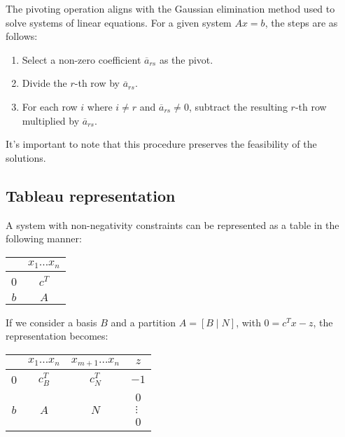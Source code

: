 The pivoting operation aligns with the Gaussian elimination method used to solve systems of linear equations. 
For a given system $Ax=b$, the steps are as follows:
\begin{enumerate}
    \item Select a non-zero coefficient $\overline{a}_{rs}$ as the pivot.
    \item Divide the $r$-th row by $\overline{a}_{rs}$. 
    \item For each row $i$ where $i \neq r$ and $\overline{a}_{rs} \neq 0$, subtract the resulting $r$-th row multiplied by $\overline{a}_{rs}$. 
\end{enumerate}
It's important to note that this procedure preserves the feasibility of the solutions.

\subsection{Tableau representation}
A system with non-negativity constraints can be represented as a table in the following manner:
\begin{table}[H]
    \centering
    \begin{tabular}{cc}
                              & $x_1 \dots x_n$            \\ \hline
    \multicolumn{1}{|c|}{0}   & \multicolumn{1}{c|}{$c^T$} \\ \hline
    \multicolumn{1}{|c|}{$b$} & \multicolumn{1}{c|}{$A$}   \\ \hline
    \end{tabular}
\end{table}
If we consider a basis $B$ and a partition $A=\left[B\mid N\right]$, with $0=c^Tx-z$, the representation becomes:
\begin{table}[H]
    \centering
    \begin{tabular}{cccc}
                              & $x_1 \dots x_n$              & $x_{m+1}\dots x_n$           & $z$                                                                                                                                                                      \\ \hline
    \multicolumn{1}{|c|}{0}   & \multicolumn{1}{c|}{$c^T_B$} & \multicolumn{1}{c|}{$c^T_N$} & \multicolumn{1}{c|}{$-1$}                                                                                                                                                \\ \hline
    \multicolumn{1}{|c|}{$b$} & \multicolumn{1}{c|}{$A$}     & \multicolumn{1}{c|}{$N$}     & \multicolumn{1}{c|}{$\begin{matrix}0\\\vdots\\0\end{matrix}$} \\ \hline
    \end{tabular}
\end{table}
